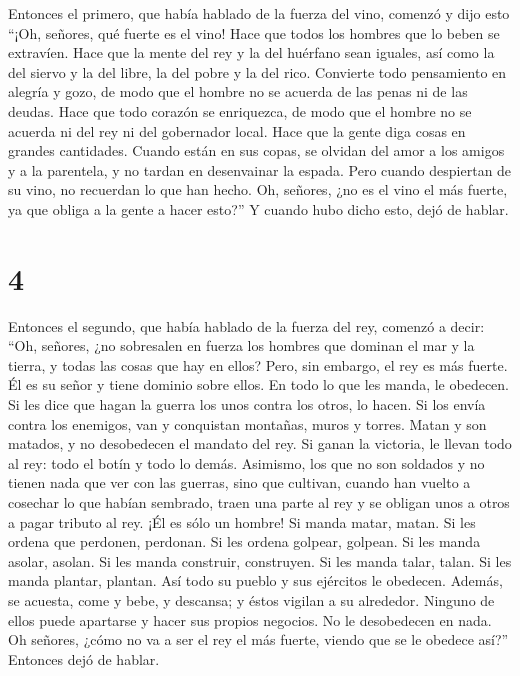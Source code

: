 Entonces el primero, que había hablado de la fuerza del vino, comenzó
 y dijo esto ``¡Oh, señores, qué fuerte es el vino! Hace
que todos los hombres que lo beben se extravíen.  Hace
que la mente del rey y la del huérfano sean iguales, así como la del
siervo y la del libre, la del pobre y la del rico. 
Convierte todo pensamiento en alegría y gozo, de modo que el hombre no
se acuerda de las penas ni de las deudas.  Hace que todo
corazón se enriquezca, de modo que el hombre no se acuerda ni del rey ni
del gobernador local. Hace que la gente diga cosas en grandes
cantidades.  Cuando están en sus copas, se olvidan del
amor a los amigos y a la parentela, y no tardan en desenvainar la
espada.  Pero cuando despiertan de su vino, no recuerdan
lo que han hecho.  Oh, señores, ¿no es el vino el más
fuerte, ya que obliga a la gente a hacer esto?'' Y cuando hubo dicho
esto, dejó de hablar.

\hypertarget{section-3}{%
\section{4}\label{section-3}}

 Entonces el segundo, que había hablado de la fuerza del
rey, comenzó a decir:  ``Oh, señores, ¿no sobresalen en
fuerza los hombres que dominan el mar y la tierra, y todas las cosas que
hay en ellos?  Pero, sin embargo, el rey es más fuerte. Él
es su señor y tiene dominio sobre ellos. En todo lo que les manda, le
obedecen.  Si les dice que hagan la guerra los unos contra
los otros, lo hacen. Si los envía contra los enemigos, van y conquistan
montañas, muros y torres.  Matan y son matados, y no
desobedecen el mandato del rey. Si ganan la victoria, le llevan todo al
rey: todo el botín y todo lo demás.  Asimismo, los que no
son soldados y no tienen nada que ver con las guerras, sino que
cultivan, cuando han vuelto a cosechar lo que habían sembrado, traen una
parte al rey y se obligan unos a otros a pagar tributo al rey.
 ¡Él es sólo un hombre! Si manda matar, matan. Si les
ordena que perdonen, perdonan.  Si les ordena golpear,
golpean. Si les manda asolar, asolan. Si les manda construir,
construyen.  Si les manda talar, talan. Si les manda
plantar, plantan.  Así todo su pueblo y sus ejércitos le
obedecen. Además, se acuesta, come y bebe, y descansa;  y
éstos vigilan a su alrededor. Ninguno de ellos puede apartarse y hacer
sus propios negocios. No le desobedecen en nada.  Oh
señores, ¿cómo no va a ser el rey el más fuerte, viendo que se le
obedece así?'' Entonces dejó de hablar.


